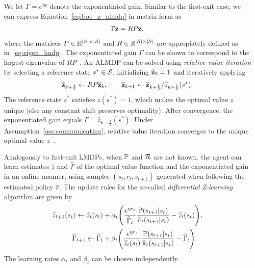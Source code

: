 We let $\Gamma=e^{\eta\rho}$ denote the exponentiated gain. Similar to the first-exit case, we can express Equation~\eqref{eq:boe_z_almdp} in matrix form as
\begin{equation}\label{eq:rel_opt}
  \Gamma {\bf z} = R P {\bf z},
\end{equation}
where the matrices $P\in \mathbb{R}^{\lvert\mathcal{S}\rvert\times\lvert\mathcal{S}\rvert}$ and $R\in \mathbb{R}^{\lvert\mathcal{S}\rvert\times\lvert\mathcal{S}\rvert}$ are appropiately defined as in~\eqref{eq:eigen_lmdp}. The exponentiated gain $\Gamma$ can be shown to correspond to the largest eigenvalue of $RP$~\citep{Todorov2009}.
An ALMDP can be solved using {\em relative value iteration} by selecting a reference state $s^*\in\mathcal{S}$, initializing $\widehat{\bf z}_0={\bf 1}$ and iteratively applying
\begin{equation*}
  \widehat{\bf z}_{k+\frac 1 2} \gets R P \widehat{\bf z}_k, \quad \quad \widehat{\bf z}_{k+1} \gets \widehat{\bf z}_{k+\frac 1 2} / \widehat z_{k+\frac 1 2}(s^*).
\end{equation*}
The reference state $s^*$ satisfies $z(s^*)=1$, which makes the optimal value $z$ unique (else any constant shift preserves optimality). After convergence, the exponentiated gain equals $\Gamma=\widehat z_{k+\frac 1 2}(s^*)$. Under Assumption~\ref{ass:communicating}, relative value iteration converges to the unique optimal value $z$~\citep{Todorov2009}.

Analogously to first-exit LMDPs, when $\mathbb{P}$ and $\mathcal{R}$ are not known, the agent can learn estimates $\widehat z$ and $\widehat\Gamma$ of the optimal value function and the exponentiated gain in an online manner, using samples $(s_t, r_t, s_{t+1})$ generated when following the estimated policy $\widehat\pi$. The update rules for the so-called \textit{differential Z-learning} algorithm are given by
\begin{align}
  \widehat{z}_{t+1}(s_t)  \gets \widehat{z}_{t}(s_{t}) & + \alpha_t \Bigg(\frac{e^{\eta r_t}}{\widehat\Gamma_t}\dfrac{\kernel(s_{t+1}\lvert s_t)}{\widehat\pi_t(s_{t+1}\lvert s_t)}  - \widehat z_t(s_t)\Bigg),\label{eq:diff_update_z}  \\   %
  \widehat\Gamma_{t+1}    \gets \widehat\Gamma_t       & + \beta_t \Bigg(\frac{e^{\eta r_t}}{\widehat z_t(s_t)}\dfrac{\kernel(s_{t+1}\lvert s_t)}{\widehat\pi_t(s_{t+1}\lvert s_t)}  - \widehat \Gamma_t\Bigg).\label{eq:diff_update_gamma}
\end{align}
The learning rates $\alpha_t$ and $\beta_t$ can be chosen independently.

